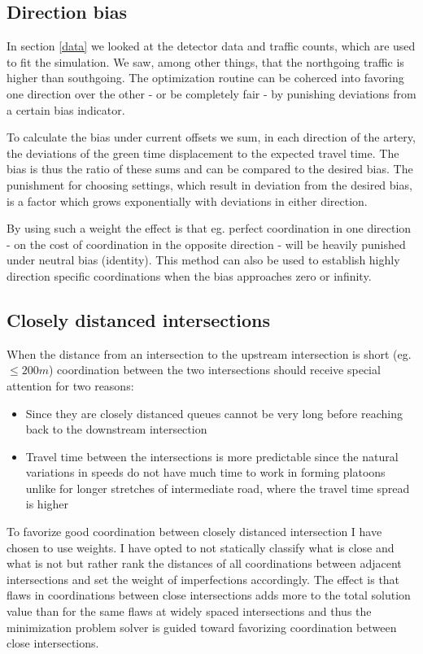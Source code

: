 \subsection{Direction bias}
In section \ref{data} we looked at the detector data and traffic counts, which are used to fit the simulation. We saw, among other things, that the northgoing traffic is higher than southgoing. The optimization routine can be coherced into favoring one direction over the other - or be completely fair - by punishing deviations from a certain bias indicator.

To calculate the bias under current offsets we sum, in each direction of the artery, the deviations of the green time displacement to the expected travel time. The bias is thus the ratio of these sums and can be compared to the desired bias. The punishment for choosing settings, which result in deviation from the desired bias, is a factor which grows exponentially with deviations in either direction.

By using such a weight the effect is that eg. perfect coordination in one direction - on the cost of coordination in the opposite direction - will be heavily punished under neutral bias (identity). This method can also be used to establish highly direction specific coordinations when the bias approaches zero or infinity.

\subsection{Closely distanced intersections}
When the distance from an intersection to the upstream intersection is short (eg. $\leq 200 m$) coordination between the two intersections should receive special attention for two reasons:

\begin{itemize}
\item Since they are closely distanced queues cannot be very long before reaching back to the downstream intersection
\item Travel time between the intersections is more predictable since the natural variations in speeds do not have much time to work in forming platoons unlike for longer stretches of intermediate road, where the travel time spread is higher
\end{itemize}

To favorize good coordination between closely distanced intersection I have chosen to use weights.  I have opted to not statically classify what is close and what is not but rather rank the distances of all coordinations between adjacent intersections and set the weight of imperfections accordingly. The effect is that flaws in coordinations between close intersections adds more to the total solution value than for the same flaws at widely spaced intersections and thus the minimization problem solver is guided toward favorizing coordination between close intersections.

